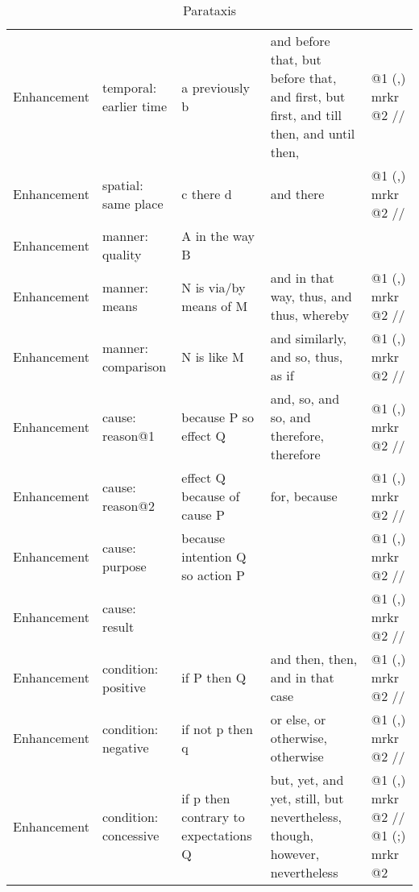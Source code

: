 \begin{landscape}
\begin{table}[]
{\begin{tabulary}{3\textwidth}{p{7em}p{10em}p{10em}p{18em}p{18em}}
        Enhancement & temporal: earlier time & a previously b & and before that, but before that, and first, but first, and till then, and until then, & @1 (,) mrkr @2 // \\
        Enhancement & spatial: same place & c there d & and there & @1 (,) mrkr @2 // \\
        Enhancement & manner: quality & A in the way B &  &  \\
        Enhancement & manner: means & N is via/by means of M & and in that way, thus, and thus, whereby & @1 (,) mrkr @2 // \\
        Enhancement & manner: comparison & N is like M & and similarly, and so, thus, as if & @1 (,) mrkr @2 // \\
        Enhancement & cause: reason@1 & because P so effect Q & and, so, and so, and therefore, therefore & @1 (,) mrkr @2 // \\
        Enhancement & cause: reason@2 & effect Q because of cause P & for, because & @1 (,) mrkr @2 // \\
        Enhancement & cause: purpose & because intention Q so action P &  & @1 (,) mrkr @2 // \\
        Enhancement & cause: result &  &  & @1 (,) mrkr @2 // \\
        Enhancement & condition: positive & if P then Q & and then, then, and in that case & @1 (,) mrkr @2 // \\
        Enhancement & condition: negative & if not p then q & or else, or otherwise, otherwise & @1 (,) mrkr @2 // \\
        Enhancement & condition: concessive & if p then contrary to expectations Q & but, yet, and yet, still, but nevertheless, though, however, nevertheless & @1 (,) mrkr @2 // @1 (;) mrkr @2 \\ \bottomrule
        \end{tabulary}%
    }
    \caption{Parataxis}
    \label{tab:parataxis}
    \end{table}
    \end{landscape}
    
    \newpage
    
